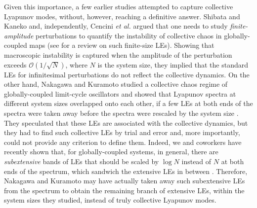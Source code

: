 \documentclass[12pt]{iopart}
\begin{document}
Given this importance,
 a few earlier studies attempted to capture collective Lyapunov modes,
 without, however, reaching a definitive answer.
Shibata and Kaneko \cite{Shibata.Kaneko-PRL1998}
 and, independently, Cencini \textit{et al.} \cite{Cencini.etal-PD1999}
 argued that one needs to study \textit{finite-amplitude} perturbations
 to quantify the instability of collective chaos in globally-coupled maps
 (see \cite{Cencini.Vulpiani-JPA2012} for a review on such finite-size LEs).
Showing that macroscopic instability is captured
 when the amplitude of the perturbation exceeds $\mathcal{O}(1/\sqrt{N})$,
 where $N$ is the system size,
 they implied that the standard LEs for infinitesimal perturbations
 do not reflect the collective dynamics.
On the other hand, Nakagawa and Kuramoto
 studied a collective chaos regime of globally-coupled limit-cycle oscillators
 and showed that Lyapunov spectra at different system sizes
 overlapped onto each other, if a few LEs
 at both ends of the spectra
 were taken away before the spectra were rescaled by the system size
 \cite{Nakagawa.Kuramoto-PD1995}.
They speculated that these LEs are associated with the collective dynamics,
 but they had to find such collective LEs by trial and error
 and, more importantly, could not provide any criterion to define them.
Indeed, we and coworkers have recently shown that,
 for globally-coupled systems, in general,
 there are \textit{subextensive} bands of LEs 
 that should be scaled by $\log N$ instead of $N$
 at both ends of the spectrum,
 which sandwich the extensive LEs in between \cite{Takeuchi.etal-PRL2011}.
Therefore, Nakagawa and Kuramoto may have actually taken away
 such subextensive LEs from the spectrum to obtain the remaining branch
 of extensive LEs, within the system sizes they studied,
 instead of truly collective Lyapunov modes.
\end{document}
